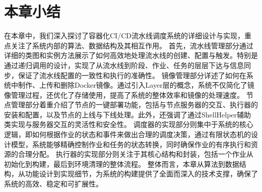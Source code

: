 \section{本章小结}
在本章中，我们深入探讨了容器化CI/CD流水线调度系统的详细设计与实现，重点关注了系统内部的算法、数据结构及其相互作用。
首先，流水线管理部分通过详细的类图和实例方法展示了如何高效地处理流水线的创建、配置与触发。特别是通过递归调用的设计，实现了从流水线到阶段、作业、任务的层层下达与信息同步，保证了流水线配置的一致性和执行的准确性。
镜像管理部分详述了如何在系统中制作、上传和删除Docker镜像。通过引入Layer层的概念，系统不仅简化了镜像管理过程，还优化了存储使用，提高了系统的整体效率和镜像的处理速度。
节点管理部分着重介绍了节点的一键部署功能，包括与节点服务器的交互、执行器的安装和配置，以及节点的上线与下线处理。此外，还强调了通过ShellHelper辅助类实现与服务器交互的灵活性和安全性。
调度器的实现部分则集中于系统的核心逻辑，即如何根据作业的状态和事件来做出合理的调度决策，通过有限状态机的设计模型，系统能够精确控制作业和任务的状态转换，同时确保作业的有序执行和资源的合理分配。
执行器的实现部分则关注于其核心结构和封装，包括一个作业从初始化到构建，最后到环境清理的整体流程。
整体而言，本章从算法到数据结构，从功能设计到实现细节，为系统的构建提供了全面而深入的技术支撑，确保了系统的高效、稳定和可扩展性。